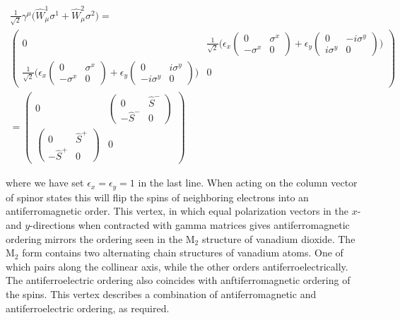 \documentclass[prb,showpacs,superscriptaddress,titlepage,amsmath,amssymb,twocolumn]{revtex4-1}
\begin{document}
\begin{widetext}
\begin{multline*}
\frac{1}{\sqrt{2}}\gamma^{\mu}\big(\hat{W}^{1}_{\mu}\sigma^{1}+\hat{W}^{2}_{\mu}\sigma^{2}\big) = \\
\begin{pmatrix}0&\frac{1}{\sqrt{2}}\bigg(\epsilon_{x}\begin{pmatrix}0&\sigma^{x}\\-\sigma^{x}&0\end{pmatrix}+\epsilon_{y}\begin{pmatrix}0&-i\sigma^{y}\\i\sigma^{y}&0\end{pmatrix}\bigg)\\\frac{1}{\sqrt{2}}\bigg(\epsilon_{x}\begin{pmatrix}0&\sigma^{x}\\-\sigma^{x}&0\end{pmatrix}+\epsilon_{y}\begin{pmatrix}0&i\sigma^{y}\\-i\sigma^{y}&0\end{pmatrix}\bigg)&0\end{pmatrix}\\ = \begin{pmatrix}0&\begin{pmatrix}0&\hat{S}^{-}\\-\hat{S}^{-}&0\end{pmatrix}\\\begin{pmatrix}0&\hat{S}^{+}\\-\hat{S}^{+}&0\end{pmatrix}&0\end{pmatrix}
\end{multline*}
\end{widetext}
where we have set $\epsilon_{x} = \epsilon_{y} = 1$ in the last line. When acting on the column vector of spinor states this will flip the spins of neighboring electrons into an antiferromagnetic order. This vertex, in which equal polarization vectors in the $x$- and $y$-directions when contracted with gamma matrices gives antiferromagnetic ordering mirrors the ordering seen in the M$_{2}$ structure of vanadium dioxide.\cite{Pouget1974} The M$_{2}$ form contains two alternating chain structures of vanadium atoms. One of which pairs along the collinear axis, while the other orders antiferroelectrically. The antiferroelectric ordering also coincides with anftiferromagnetic ordering of the spins. This vertex describes a combination of antiferromagnetic and antiferroelectric ordering, as required.
\end{document}
